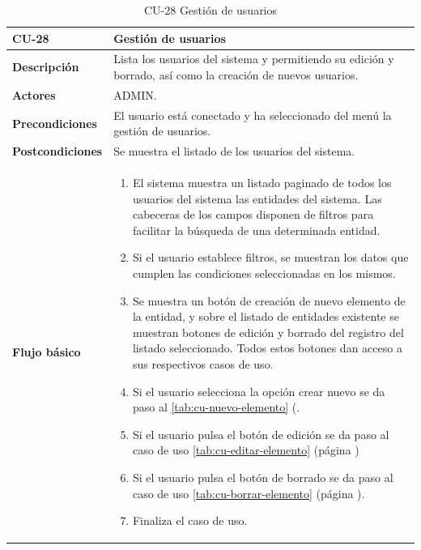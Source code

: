 \begin{table} [H]
    \centering
    \setlength{\leftmargini}{0.4cm}
	\resizebox{15cm}{!} { %
    \begin{tabular}{| m{3cm} | m{12cm} |}   
    \hline
	  \textbf{CU-28} & \textbf{Gestión de usuarios} \\\hline
	  \textbf{Descripción} & Lista los usuarios del sistema y permitiendo su edición y borrado, así como la creación de nuevos usuarios. \\\hline
	  \textbf{Actores} & ADMIN. \\\hline
	  \textbf{Precondiciones} & El usuario está conectado y ha seleccionado del menú la gestión de usuarios. \\\hline
	  \textbf{Postcondiciones} & Se muestra el listado de los usuarios del sistema. \\\hline
	  \textbf{Flujo básico} & 
		\begin{enumerate}
	  	\item El sistema muestra un listado paginado de todos los usuarios del sistema las entidades del sistema. Las cabeceras de los campos disponen de filtros para facilitar la búsqueda de una determinada entidad.
		\item Si el usuario establece filtros, se muestran los datos que cumplen las condiciones seleccionadas en los mismos.
		\item Se muestra un botón de creación de nuevo elemento de la entidad, y sobre el listado de entidades existente se muestran botones de edición y borrado del registro del listado seleccionado. Todos estos botones dan acceso a sus respectivos casos de uso.
		\item Si el usuario selecciona la opción crear nuevo se da paso al \ref{tab:cu-nuevo-elemento} (\pageref{tab:cu-nuevo-elemento}.
		\item Si el usuario pulsa el botón de edición se da paso al caso de uso \ref{tab:cu-editar-elemento} (página \pageref{tab:cu-editar-elemento})
		\item Si el usuario pulsa el botón de borrado se da paso al caso de uso \ref{tab:cu-borrar-elemento} (página \pageref{tab:cu-borrar-elemento}).		  
		\item Finaliza el caso de uso.		
	  \end{enumerate} 	  	  
	  \\\hline
    \end{tabular}
    } %
    \caption{CU-28 Gestión de usuarios}
    \label{tab:cu-gestión-usuarios}
\end{table}

